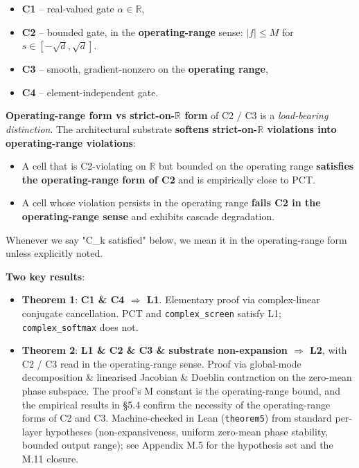 \documentclass[11pt,a4paper]{article}
\theoremstyle{plain}
\theoremstyle{definition}
\begin{document}
\begin{itemize}
  \item \textbf{C1} -- real-valued gate $\alpha  \in  \mathbb{R}$,
  \item \textbf{C2} -- bounded gate, in the \textbf{operating-range} sense: $|f| \le M$ for $s \in [-\sqrt{d}, \sqrt{d}]$.
  \item \textbf{C3} -- smooth, gradient-nonzero on the \textbf{operating range},
  \item \textbf{C4} -- element-independent gate.
\end{itemize}

\textbf{Operating-range form vs strict-on-$\mathbb{R}$ form} of C2 / C3 is a \emph{load-bearing distinction}. The architectural substrate \textbf{softens strict-on-$\mathbb{R}$ violations into operating-range violations}:

\begin{itemize}
  \item A cell that is C2-violating on $\mathbb{R}$ but bounded on the operating range \textbf{satisfies the operating-range form of C2} and is empirically close to PCT.
  \item A cell whose violation persists in the operating range \textbf{fails C2 in the operating-range sense} and exhibits cascade degradation.
\end{itemize}

Whenever we say "C\_k satisfied" below, we mean it in the operating-range form unless explicitly noted.

\textbf{Two key results}:

\begin{itemize}
  \item \textbf{Theorem 1}: \textbf{C1 \& C4 $\Rightarrow$ L1}. Elementary proof via complex-linear conjugate cancellation. PCT and \texttt{complex\_screen} satisfy L1; \texttt{complex\_softmax} does not.
  \item \textbf{Theorem 2}: \textbf{L1 \& C2 \& C3 \& substrate non-expansion $\Rightarrow$ L2}, with C2 / C3 read in the operating-range sense. Proof via global-mode decomposition \& linearised Jacobian \& Doeblin contraction on the zero-mean phase subspace. The proof's M constant is the operating-range bound, and the empirical results in \S{}5.4 confirm the necessity of the operating-range forms of C2 and C3. Machine-checked in Lean (\texttt{theorem5}) from standard per-layer hypotheses (non-expansiveness, uniform zero-mean phase stability, bounded output range); see Appendix M.5 for the hypothesis set and the M.11 closure.
\end{itemize}
\end{document}
